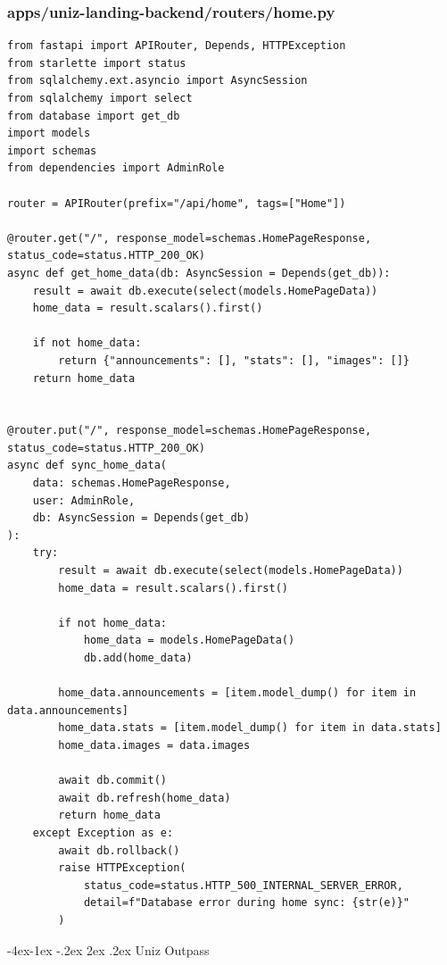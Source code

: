 \documentclass[11pt,a4paper,oneside]{article}
\makeatletter
\renewcommand{\subsection}{\@startsection{subsection}{2}{\z@}%
    {-4ex\@plus -1ex \@minus -.2ex}%
    {2ex \@plus .2ex}%
    {\normalfont\Large\bfseries\color{accent}}}
\makeatother
\begin{document}
\subsubsection*{apps/uniz-landing-backend/routers/home.py}
\begin{lstlisting}
from fastapi import APIRouter, Depends, HTTPException
from starlette import status
from sqlalchemy.ext.asyncio import AsyncSession
from sqlalchemy import select
from database import get_db
import models
import schemas
from dependencies import AdminRole

router = APIRouter(prefix="/api/home", tags=["Home"])

@router.get("/", response_model=schemas.HomePageResponse, status_code=status.HTTP_200_OK)
async def get_home_data(db: AsyncSession = Depends(get_db)):
    result = await db.execute(select(models.HomePageData))
    home_data = result.scalars().first()
    
    if not home_data:
        return {"announcements": [], "stats": [], "images": []}
    return home_data


@router.put("/", response_model=schemas.HomePageResponse, status_code=status.HTTP_200_OK)
async def sync_home_data(
    data: schemas.HomePageResponse, 
    user: AdminRole,
    db: AsyncSession = Depends(get_db)
):
    try:
        result = await db.execute(select(models.HomePageData))
        home_data = result.scalars().first()
        
        if not home_data:
            home_data = models.HomePageData()
            db.add(home_data)

        home_data.announcements = [item.model_dump() for item in data.announcements]
        home_data.stats = [item.model_dump() for item in data.stats]
        home_data.images = data.images

        await db.commit()
        await db.refresh(home_data)
        return home_data
    except Exception as e:
        await db.rollback()
        raise HTTPException(
            status_code=status.HTTP_500_INTERNAL_SERVER_ERROR, 
            detail=f"Database error during home sync: {str(e)}"
        )
\end{lstlisting}

\subsection{Uniz Outpass}
\end{document}
